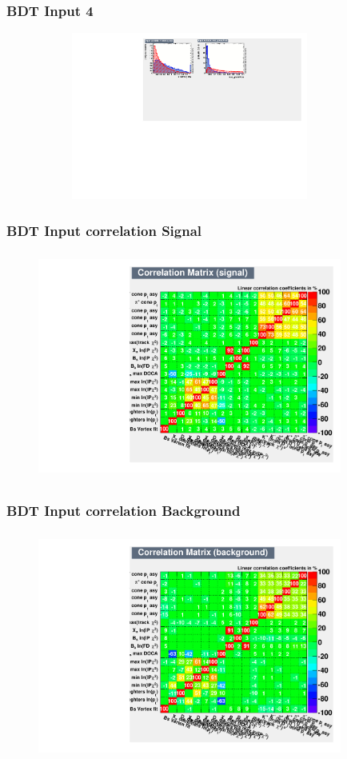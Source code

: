 \documentclass[]{beamer}
\begin{document}
\begin{frame}
\frametitle{BDT Input 4}

\begin{figure}
\includegraphics[width=10.0cm,height=5.5cm]{pics/BD_Input_12_4}
\end{figure}

\end{frame}

\begin{frame}
\frametitle{BDT Input correlation Signal}

\begin{figure}
\includegraphics[width=10.0cm,height=7.5cm]{pics/BDT_correlation_signal}
\end{figure}

\end{frame}


\begin{frame}
\frametitle{BDT Input correlation Background}

\begin{figure}
\includegraphics[width=10.0cm,height=7.5cm]{pics/BDT_correlation_background}
\end{figure}

\end{frame}
\end{document}
